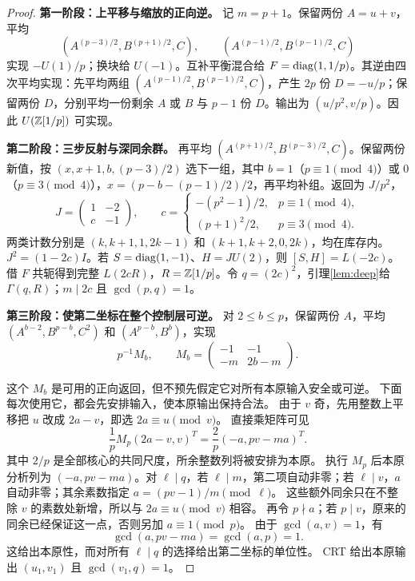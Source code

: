 \begin{proof}

\par\noindent\textbf{第一阶段：上平移与缩放的正向逆。}
记 $m=p+1$。保留两份 $A=u+v$，平均
\[(A^{(p-3)/2},B^{(p+1)/2},C),\qquad
(A^{(p-1)/2},B^{(p-1)/2},C)
\]
实现 $-U(1)/p$；换块给 $U(-1)$。互补平衡混合给 $F=\operatorname{diag}(1,1/p)$。其逆由四次平均实现：先平均两组 $(A^{(p-1)/2},B^{(p-1)/2},C)$，产生 $2p$ 份 $D=-u/p$；保留两份 $D$，分别平均一份剩余 $A$ 或 $B$ 与 $p-1$ 份 $D$。输出为 $(u/p^2,v/p)$。因此 $U(\mathbb Z[1/p])$ 可实现。

\par\noindent\textbf{第二阶段：三步反射与深同余群。}
再平均 $(A^{(p+1)/2},B^{(p-3)/2},C)$。保留两份新值，按 $(x,x+1,b,(p-3)/2)$ 选下一组，其中 $b=1$（$p\equiv1\pmod4$）或 $0$（$p\equiv3\pmod4$），$x=(p-b-(p-1)/2)/2$，再平均补组。返回为 $J/p^2$，
\[
J=\begin{pmatrix}1&-2\\c&-1\end{pmatrix},\qquad
c=\begin{cases}-(p^2-1)/2,&p\equiv1\pmod4,\\(p+1)^2/2,&p\equiv3\pmod4.
\end{cases}
\]
两类计数分别是 $(k,k+1,1,2k-1)$ 和 $(k+1,k+2,0,2k)$，均在库存内。$J^2=(1-2c)I$。若 $S=\operatorname{diag}(1,-1)$、$H=JU(2)$，则 $[S,H]=L(-2c)$。借 $F$ 共轭得到完整 $L(2cR)$，$R=\mathbb Z[1/p]$。令 $q=(2c)^2$，引理\ref{lem:deep}给 $\Gamma(q,R)$；$m\mid2c$ 且 $\gcd(p,q)=1$。


\par\noindent\textbf{第三阶段：使第二坐标在整个控制层可逆。}
对 $2\le b\le p$，保留两份 $A$，平均 $(A^{b-2},B^{p-b},C^2)$ 和 $(A^{p-b},B^b)$，实现
\[
p^{-1}M_b,\qquad M_b=\begin{pmatrix}-1&-1\\-m&2b-m\end{pmatrix}.
\]

这个 $M_b$ 是可用的正向返回，但不预先假定它对所有本原输入安全或可逆。
下面每次使用它，都会先安排输入，使本原输出保持合法。
由于 $v$ 奇，先用整数上平移把 $u$ 改成 $2a-v$，即选 $2a\equiv u\pmod v$。
直接乘矩阵可见
\[
\frac1pM_p(2a-v,v)^T=\frac2p(-a,pv-ma)^T.
\]
其中 $2/p$ 是全部核心的共同尺度，所余整数列将被安排为本原。
执行 $M_p$ 后本原分析列为 $(-a,pv-ma)$。对 $\ell\mid q$，若 $\ell\mid m$，第二项自动非零；若 $\ell\mid v$，$a$ 自动非零；其余素数指定 $a=(pv-1)/m\pmod\ell$。
这些额外同余只在不整除 $v$ 的素数处新增，所以与 $2a\equiv u\pmod v$ 相容。
再令 $p\nmid a$；若 $p\mid v$，原来的同余已经保证这一点，否则另加 $a\equiv1\pmod p$。
由于 $\gcd(a,v)=1$，有
\[
\gcd(a,pv-ma)=\gcd(a,p)=1.
\]
这给出本原性，而对所有 $\ell\mid q$ 的选择给出第二坐标的单位性。
CRT 给出本原输出 $(u_1,v_1)$ 且 $\gcd(v_1,q)=1$。


\end{proof}
